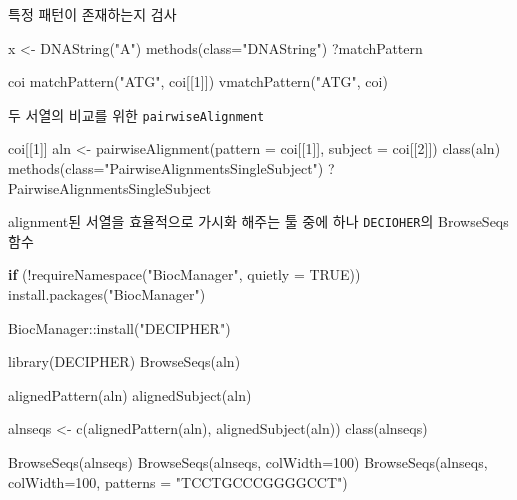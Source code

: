 \documentclass[
]{book}
\newenvironment{Shaded}{\begin{snugshade}}{\end{snugshade}}
\newcommand{\AttributeTok}[1]{\textcolor[rgb]{0.77,0.63,0.00}{#1}}
\newcommand{\ConstantTok}[1]{\textcolor[rgb]{0.00,0.00,0.00}{#1}}
\newcommand{\ControlFlowTok}[1]{\textcolor[rgb]{0.13,0.29,0.53}{\textbf{#1}}}
\newcommand{\DecValTok}[1]{\textcolor[rgb]{0.00,0.00,0.81}{#1}}
\newcommand{\FunctionTok}[1]{\textcolor[rgb]{0.00,0.00,0.00}{#1}}
\newcommand{\NormalTok}[1]{#1}
\newcommand{\OtherTok}[1]{\textcolor[rgb]{0.56,0.35,0.01}{#1}}
\newcommand{\SpecialCharTok}[1]{\textcolor[rgb]{0.00,0.00,0.00}{#1}}
\newcommand{\StringTok}[1]{\textcolor[rgb]{0.31,0.60,0.02}{#1}}
\begin{document}
특정 패턴이 존재하는지 검사

\begin{Shaded}
\begin{Highlighting}[]
\NormalTok{x }\OtherTok{\textless{}{-}} \FunctionTok{DNAString}\NormalTok{(}\StringTok{"A"}\NormalTok{)}
\FunctionTok{methods}\NormalTok{(}\AttributeTok{class=}\StringTok{"DNAString"}\NormalTok{)}
\NormalTok{?matchPattern}

\NormalTok{coi}
\FunctionTok{matchPattern}\NormalTok{(}\StringTok{"ATG"}\NormalTok{, coi[[}\DecValTok{1}\NormalTok{]])}
\FunctionTok{vmatchPattern}\NormalTok{(}\StringTok{"ATG"}\NormalTok{, coi) }
\end{Highlighting}
\end{Shaded}

두 서열의 비교를 위한 \texttt{pairwiseAlignment}

\begin{Shaded}
\begin{Highlighting}[]
\NormalTok{coi[[}\DecValTok{1}\NormalTok{]]}
\NormalTok{aln }\OtherTok{\textless{}{-}} \FunctionTok{pairwiseAlignment}\NormalTok{(}\AttributeTok{pattern =}\NormalTok{ coi[[}\DecValTok{1}\NormalTok{]], }\AttributeTok{subject =}\NormalTok{ coi[[}\DecValTok{2}\NormalTok{]])}
\FunctionTok{class}\NormalTok{(aln)}
\FunctionTok{methods}\NormalTok{(}\AttributeTok{class=}\StringTok{"PairwiseAlignmentsSingleSubject"}\NormalTok{)}
\NormalTok{?PairwiseAlignmentsSingleSubject}
\end{Highlighting}
\end{Shaded}

alignment된 서열을 효율적으로 가시화 해주는 툴 중에 하나 \texttt{DECIOHER}의 BrowseSeqs 함수

\begin{Shaded}
\begin{Highlighting}[]
\ControlFlowTok{if}\NormalTok{ (}\SpecialCharTok{!}\FunctionTok{requireNamespace}\NormalTok{(}\StringTok{"BiocManager"}\NormalTok{, }\AttributeTok{quietly =} \ConstantTok{TRUE}\NormalTok{))}
    \FunctionTok{install.packages}\NormalTok{(}\StringTok{"BiocManager"}\NormalTok{)}

\NormalTok{BiocManager}\SpecialCharTok{::}\FunctionTok{install}\NormalTok{(}\StringTok{"DECIPHER"}\NormalTok{)}

\FunctionTok{library}\NormalTok{(DECIPHER)}
\FunctionTok{BrowseSeqs}\NormalTok{(aln)}

\FunctionTok{alignedPattern}\NormalTok{(aln)}
\FunctionTok{alignedSubject}\NormalTok{(aln)}

\NormalTok{alnseqs }\OtherTok{\textless{}{-}} \FunctionTok{c}\NormalTok{(}\FunctionTok{alignedPattern}\NormalTok{(aln), }\FunctionTok{alignedSubject}\NormalTok{(aln))}
\FunctionTok{class}\NormalTok{(alnseqs)}


\FunctionTok{BrowseSeqs}\NormalTok{(alnseqs)}
\FunctionTok{BrowseSeqs}\NormalTok{(alnseqs, }\AttributeTok{colWidth=}\DecValTok{100}\NormalTok{)}
\FunctionTok{BrowseSeqs}\NormalTok{(alnseqs, }\AttributeTok{colWidth=}\DecValTok{100}\NormalTok{, }\AttributeTok{patterns =} \StringTok{"TCCTGCCCGGGGCCT"}\NormalTok{)}
\end{Highlighting}
\end{Shaded}
\end{document}
